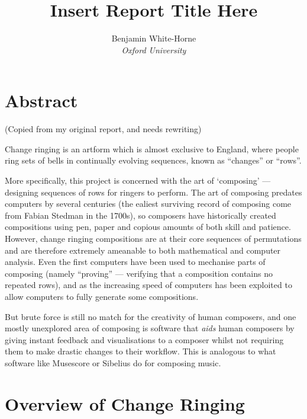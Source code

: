 \documentclass[12pt]{article}
\title{Insert Report Title Here}
\author{Benjamin White-Horne \\ \emph{Oxford University}}
\begin{document}
\maketitle



\pagebreak

\tableofcontents



\pagebreak

\section{Abstract}

(Copied from my original report, and needs rewriting)

Change ringing is an artform which is almost exclusive to England, where people ring sets of bells
in continually evolving sequences, known as ``changes'' or ``rows''.

More specifically, this project is concerned with the art of `composing' --- designing sequences of
rows for ringers to perform.  The art of composing predates computers by several centuries (the
ealiest surviving record of composing come from Fabian Stedman in the 1700s), so composers have
historically created compositions using pen, paper and copious amounts of both skill and patience.
However, change ringing compositions are at their core sequences of permutations and are therefore
extremely ameanable to both mathematical and computer analysis.  Even the first computers have been
used to mechanise parts of composing (namely ``proving'' --- verifying that a composition contains
no repeated rows), and as the increasing speed of computers has been exploited to allow computers to
fully generate some compositions.

But brute force is still no match for the creativity of human composers, and one mostly unexplored area
of composing is software that \emph{aids} human composers by giving instant feedback and
visualisations to a composer whilst not requiring them to make drastic changes to their workflow.
This is analogous to what software like Musescore or Sibelius do for composing music.



\pagebreak

\section{Overview of Change Ringing}
\end{document}
